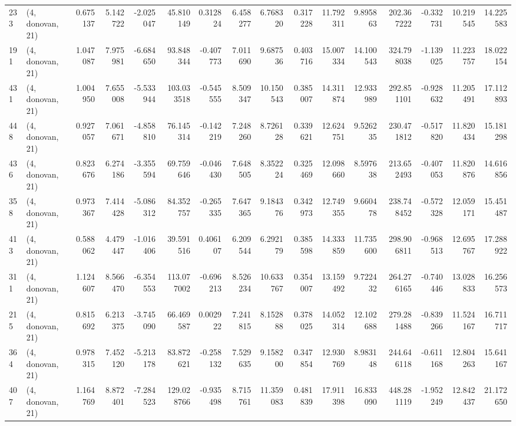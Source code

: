 \begin{tabular}{llrrrrrrrrrrrrrr}
233 &  (4, donovan, 21) &   0.675137 &   5.142722 &  -2.025047 &    45.810149 &   0.312824 &   6.458277 &   6.768320 &  0.317228 &  11.792311 &   9.895863 &   202.367222 & -0.332731 &  10.219545 &  14.225583 \\
191 &  (4, donovan, 21) &   1.047087 &   7.975981 &  -6.684650 &    93.848344 &  -0.407773 &   7.011690 &   9.687536 &  0.403716 &  15.007334 &  14.100543 &   324.798038 & -1.139025 &  11.223757 &  18.022154 \\
431 &  (4, donovan, 21) &   1.004950 &   7.655008 &  -5.533944 &   103.033518 &  -0.545555 &   8.509347 &  10.150543 &  0.385007 &  14.311874 &  12.933989 &   292.851101 & -0.928632 &  11.205491 &  17.112893 \\
448 &  (4, donovan, 21) &   0.927057 &   7.061671 &  -4.858810 &    76.145314 &  -0.142219 &   7.248260 &   8.726128 &  0.339621 &  12.624751 &   9.526235 &   230.471812 & -0.517820 &  11.820434 &  15.181298 \\
436 &  (4, donovan, 21) &   0.823676 &   6.274186 &  -3.355594 &    69.759646 &  -0.046430 &   7.648505 &   8.352224 &  0.325469 &  12.098660 &   8.597638 &   213.652493 & -0.407053 &  11.820876 &  14.616856 \\
358 &  (4, donovan, 21) &   0.973367 &   7.414428 &  -5.086312 &    84.352757 &  -0.265335 &   7.647365 &   9.184376 &  0.342973 &  12.749355 &   9.660478 &   238.748452 & -0.572328 &  12.059171 &  15.451487 \\
413 &  (4, donovan, 21) &   0.588062 &   4.479447 &  -1.016406 &    39.591516 &   0.406107 &   6.209544 &   6.292179 &  0.385598 &  14.333859 &  11.735600 &   298.906811 & -0.968513 &  12.695767 &  17.288922 \\
311 &  (4, donovan, 21) &   1.124607 &   8.566470 &  -6.354553 &   113.077002 &  -0.696213 &   8.526234 &  10.633767 &  0.354007 &  13.159492 &   9.722432 &   264.276165 & -0.740446 &  13.028833 &  16.256573 \\
215 &  (4, donovan, 21) &   0.815692 &   6.213375 &  -3.745090 &    66.469587 &   0.002922 &   7.241815 &   8.152888 &  0.378025 &  14.052314 &  12.102688 &   279.281488 & -0.839266 &  11.524167 &  16.711717 \\
364 &  (4, donovan, 21) &   0.978315 &   7.452120 &  -5.213178 &    83.872621 &  -0.258132 &   7.529635 &   9.158200 &  0.347854 &  12.930769 &   8.983148 &   244.646118 & -0.611168 &  12.804263 &  15.641167 \\
407 &  (4, donovan, 21) &   1.164769 &   8.872401 &  -7.284523 &   129.028766 &  -0.935498 &   8.715761 &  11.359083 &  0.481839 &  17.911398 &  16.833090 &   448.281119 & -1.952249 &  12.842437 &  21.172650 \\

\end{tabular}

